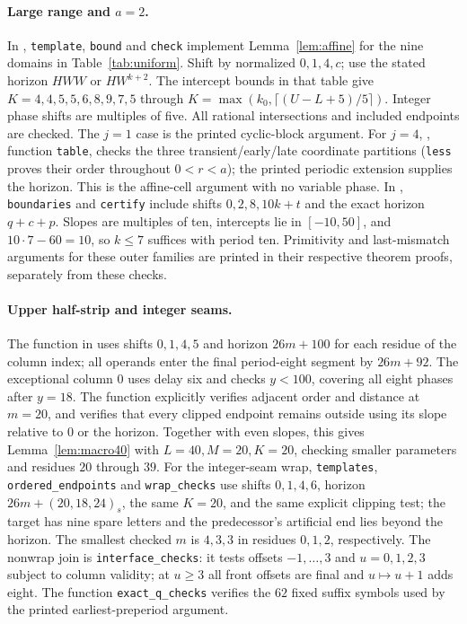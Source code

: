 \documentclass[11pt]{article}
\theoremstyle{remark}\newtheorem{remark}[theorem]{Remark}
\begin{document}
\paragraph{Large range and $a=2$.}
In , \texttt{template}, \texttt{bound}
and \texttt{check} implement Lemma~\ref{lem:affine} for the nine domains
in Table~\ref{tab:uniform}. Shift by normalized $0,1,4,c$; use the
stated horizon $HWW$ or $HW^{k+2}$. The intercept bounds in that table
give $K=4,4,5,5,6,8,9,7,5$ through
$K=\max(k_0,\lceil(U-L+5)/5\rceil)$. Integer phase shifts are multiples
of five. All rational intersections and included endpoints are checked.
The $j=1$ case is the printed cyclic-block argument.
For $j=4$, , function \texttt{table}, checks the
three transient/early/late coordinate partitions (\texttt{less} proves
their order throughout $0<r<a$); the printed periodic extension supplies
the horizon. This is the affine-cell argument with no variable phase.
In , \texttt{boundaries} and \texttt{certify}
include shifts $0,2,8,10k+t$ and the exact horizon $q+c+p$.
Slopes are multiples of ten, intercepts lie in $[-10,50]$, and
$10\cdot7-60=10$, so $k\le7$ suffices with period ten.
Primitivity and last-mismatch arguments for these outer families are
printed in their respective theorem proofs, separately from these checks.

\paragraph{Upper half-strip and integer seams.}
The function  in
 uses shifts $0,1,4,5$ and horizon $26m+100$ for each residue of the
column index; all operands enter the final period-eight segment by
$26m+92$. The exceptional column $0$ uses delay six and checks $y<100$,
covering all eight phases after $y=18$. The function explicitly verifies
adjacent order and distance at $m=20$, and verifies that every clipped
endpoint remains outside using its slope relative to $0$ or the horizon.
Together with even slopes, this gives Lemma~\ref{lem:macro40} with
$L=40,M=20,K=20$, checking smaller parameters and residues $20$ through $39$.
For the integer-seam wrap, \texttt{templates}, \texttt{ordered\_endpoints}
and \texttt{wrap\_checks} use shifts $0,1,4,6$, horizon
$26m+(20,18,24)_s$, the same $K=20$, and the same explicit clipping test;
the target has nine spare letters and the predecessor's artificial end
lies beyond the horizon. The smallest checked $m$ is $4,3,3$ in residues
$0,1,2$, respectively. The nonwrap join is \texttt{interface\_checks}:
it tests offsets $-1,\ldots,3$ and $u=0,1,2,3$ subject to column validity;
at $u\ge3$ all front offsets are final and $u\mapsto u+1$ adds eight.
The function \texttt{exact\_q\_checks} verifies the $62$ fixed suffix
symbols used by the printed earliest-preperiod argument.
\end{document}
